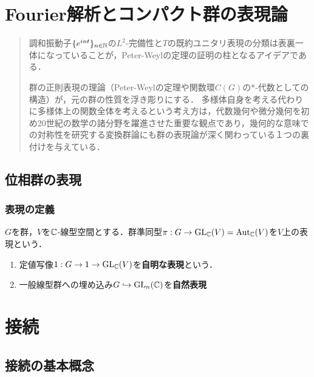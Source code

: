 \documentclass[uplatex,dvipdfmx]{jsreport}
\begin{document}
\chapter{Fourier解析とコンパクト群の表現論}

\begin{quotation}
    調和振動子$\{e^{int}\}_{n\in\mathbb{N}}$の$L^2$-完備性と$T$の既約ユニタリ表現の分類は表裏一体になっていることが，Peter-Weylの定理の証明の柱となるアイデアである．

    群の正則表現の理論（Peter-Weylの定理や関数環$C(G)$の$*$-代数としての構造）が，元の群の性質を浮き彫りにする．
    多様体自身を考える代わりに多様体上の関数全体を考えるという考え方は，代数幾何や微分幾何を初め20世紀の数学の諸分野を躍進させた重要な観点であり，幾何的な意味での対称性を研究する変換群論にも群の表現論が深く関わっている１つの裏付けを与えている．
\end{quotation}

\section{位相群の表現}

\subsection{表現の定義}

\begin{definition}
    $G$を群，$V$を$\mathbb{C}$-線型空間とする．群準同型$\pi:G\to\mathrm{GL}_{\mathbb{C}}(V)=\mathrm{Aut}_{\mathbb{C}}(V)$を$V$上の表現という．
\end{definition}

\begin{example}\mbox{}
    \begin{enumerate}
        \item 定値写像$1:G\to1\to\mathrm{GL}_{\mathbb{C}}(V)$を\textbf{自明な表現}という．
        \item 一般線型群への埋め込み$G\hookrightarrow\mathrm{GL}_n(\mathbb{C})$を\textbf{自然表現}
    \end{enumerate}
\end{example}

\chapter{接続}

\section{接続の基本概念}
\end{document}
